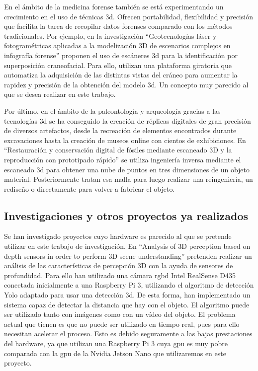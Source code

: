 En el ámbito de la medicina forense también se está experimentando un crecimiento en el uso de técnicas \gls{3d}.
Ofrecen portabilidad, flexibilidad y precisión que facilita la tarea de recopilar datos forenses comparado con los métodos tradicionales.
Por ejemplo, en la investigación ``Geotecnologías láser y fotogramétricas aplicadas a la modelización 3D de escenarios complejos en infografía forense'' \citep{blazquez2015geotecnologias} proponen el uso de escáneres \gls{3d} para la identificación por superposición craneofacial.
Para ello, utilizan una plataforma giratoria que automatiza la adquisición de las distintas vistas del cráneo para aumentar la rapidez y precisión de la obtención del modelo \gls{3d}.
Un concepto muy parecido al que se desea realizar en este trabajo.

Por último, en el ámbito de la paleontología y arqueología gracias a las tecnologías \gls{3d} se ha conseguido la creación de réplicas digitales de gran precisión de diversos artefactos, desde la recreación de elementos encontrados durante excavaciones hasta la creación de museos online con cientos de exhibiciones.
En ``Restauración y conservación digital de fósiles mediante escaneado 3D y la reproducción con prototipado rápido'' \citep{Valverde-Bastidas2020} se utiliza ingeniería inversa mediante el escaneado \gls{3d} para obtener una nube de puntos en tres dimensiones de un objeto material.
Posteriormente tratan esa malla para luego realizar una reingeniería, un rediseño o directamente para volver a fabricar el objeto.

\subsection{Investigaciones y otros proyectos ya realizados}

Se han investigado proyectos cuyo hardware es parecido al que se pretende utilizar en este trabajo de investigación.
En ``Analysis of 3D perception based on depth sensors in order to perform 3D scene understanding'' \citep{fioriti2021analysis} pretenden realizar un análisis de las características de percepción 3D con la ayuda de sensores de profundidad.
Para ello han utilizado una cámara \gls{rgbd} Intel RealSense D435 conectada inicialmente a una Raspberry Pi 3, utilizando el algoritmo de detección Yolo adaptado para usar una detección \gls{3d}.
De esta forma, han implementado un sistema capaz de detectar la distancia que hay con el objeto.
El algoritmo puede ser utilizado tanto con imágenes como con un vídeo del objeto.
El problema actual que tienen es que no puede ser utilizado en tiempo real, pues para ello necesitan acelerar el proceso.
Esto es debido seguramente a las bajas prestaciones del hardware, ya que utilizan una Raspberry Pi 3 cuya \gls{gpu} es muy pobre comparada con la \gls{gpu} de la Nvidia Jetson Nano que utilizaremos en este proyecto.

